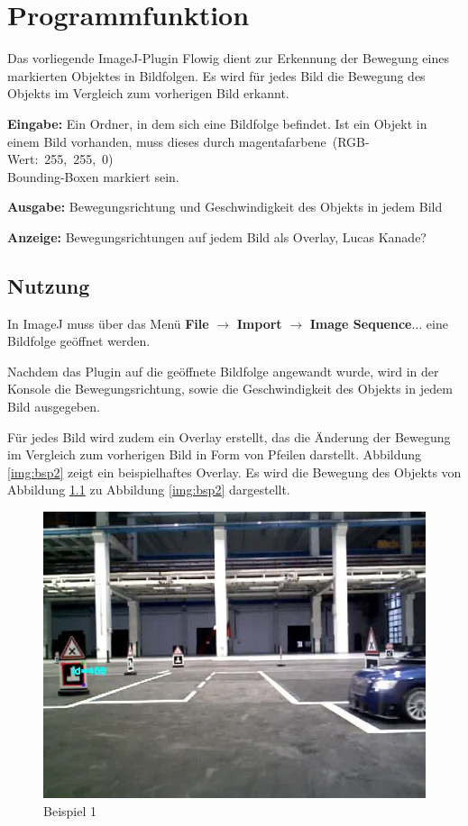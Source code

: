 
\chapter{Programmfunktion}\label{sec:Einleitung}
Das vorliegende ImageJ-Plugin Flowig dient zur Erkennung der Bewegung eines markierten Objektes in Bildfolgen. Es wird für jedes Bild die Bewegung des Objekts im Vergleich zum vorherigen Bild erkannt.

\textbf{Eingabe: } Ein Ordner, in dem sich eine Bildfolge befindet. Ist ein Objekt in einem Bild vorhanden, muss dieses durch magentafarbene~(RGB-Wert:~255,~255,~0)\\Bounding-Boxen markiert sein.


\textbf{Ausgabe: } Bewegungsrichtung und Geschwindigkeit des Objekts in jedem Bild


\textbf{Anzeige: } Bewegungsrichtungen auf jedem Bild als Overlay, Lucas Kanade?


\section{Nutzung}

In ImageJ muss über das Menü \textbf{File} $\rightarrow$ \textbf{Import} $\rightarrow$ \textbf{Image Sequence$\dots$} eine Bildfolge geöffnet werden. 

Nachdem das Plugin auf die geöffnete Bildfolge angewandt wurde, wird in der Konsole die Bewegungsrichtung, sowie die Geschwindigkeit des Objekts in jedem Bild ausgegeben.

Für jedes Bild wird zudem ein Overlay erstellt, das die Änderung der Bewegung im Vergleich zum vorherigen Bild in Form von Pfeilen darstellt. Abbildung \ref{img:bsp2} zeigt ein beispielhaftes Overlay. Es wird die Bewegung des Objekts von Abbildung \ref{img:bsp1} zu Abbildung \ref{img:bsp2} dargestellt.

\begin{figure}[h]
	\centering
	\includegraphics[scale=0.5]{./Abbildungen/bsp1.jpg}
	\caption{Beispiel 1}
	\label{img:bsp1}
\end{figure}

